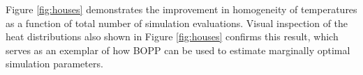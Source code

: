 Figure \ref{fig:houses} demonstrates the improvement in homogeneity of temperatures as a function of total number of simulation evaluations. Visual inspection of the heat distributions also shown in Figure \ref{fig:houses} confirms this result, which serves as an exemplar of how BOPP can be used to estimate marginally optimal simulation parameters.
